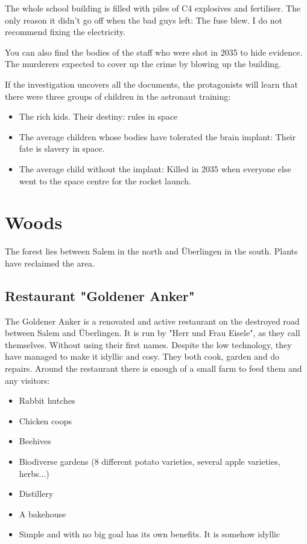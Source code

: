 The whole school building is filled with piles of C4 explosives and fertiliser. The only reason it didn't go off when the bad guys left: The fuse blew. I do not recommend fixing the electricity.

You can also find the bodies of the staff who were shot in 2035 to hide evidence. The murderers expected to cover up the crime by blowing up the building.

If the investigation uncovers all the documents, the protagonists will learn that there were three groups of children in the astronaut training:

\begin{itemize}
    \item The rich kids. Their destiny: rules in space
    \item The average children whose bodies have tolerated the brain implant: Their fate is slavery in space.
    \item The average child without the implant: Killed in 2035 when everyone else went to the space centre for the rocket launch.
\end{itemize}

\section{Woods}

The forest lies between Salem in the north and Überlingen in the south. Plants have reclaimed the area.

\subsection{Restaurant "Goldener Anker"}

The Goldener Anker is a renovated and active restaurant on the destroyed road between Salem and Überlingen. It is run by "Herr und Frau Eisele", as they call themselves. Without using their first names. Despite the low technology, they have managed to make it idyllic and cosy. They both cook, garden and do repairs.
Around the restaurant there is enough of a small farm to feed them and any visitors:

\begin{itemize}
    \item Rabbit hutches
    \item Chicken coops
    \item Beehives
    \item Biodiverse gardens (8 different potato varieties, several apple varieties, herbs...)
    \item Distillery
    \item A bakehouse
    \item Simple and with no big goal has its own benefits. It is somehow idyllic
\end{itemize}

